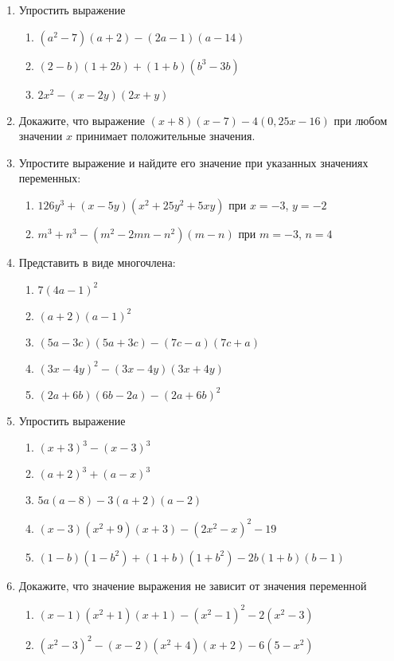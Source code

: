\documentclass[10pt, a4paper]{article}
\begin{document}

\begin{enumerate}
	\item Упростить выражение
	\begin{enumerate}[label=\asbuk*)]
		\item $(a^2-7)(a+2)-(2a-1)(a-14)$
		\item $(2-b)(1+2b)+(1+b)(b^3-3b)$
		\item $2x^2-(x-2y)(2x+y)$
	\end{enumerate}
	\item Докажите, что выражение $(x+8)(x-7)-4(0,25x-16)$ при любом значении $x$ принимает положительные значения.
	\item Упростите выражение и найдите его значение при указанных значениях переменных:
	\begin{enumerate}[label=\asbuk*)]
		\item $126y^3+(x-5y)(x^2+25y^2+5xy)$ при $x=-3$, $y=-2$
		\item $m^3+n^3-(m^2-2mn-n^2)(m-n)$ при $m=-3$, $n=4$
	\end{enumerate}
	\item Представить в виде многочлена:
	\begin{multicols}{2}
		\begin{enumerate}[label=\asbuk*)]
			\item $7(4a-1)^2$
			\item $(a+2)(a-1)^2$
			\item $(5a-3c)(5a+3c)-(7c-a)(7c+a)$
			\item $(3x-4y)^2-(3x-4y)(3x+4y)$
			\item $(2a+6b)(6b-2a)-(2a+6b)^2$
		\end{enumerate}
	\end{multicols}
	\item Упростить выражение
	\begin{multicols}{2}
		\begin{enumerate}[label=\asbuk*)]
			\item $(x+3)^3-(x-3)^3$
			\item $(a+2)^3+(a-x)^3$
			\item $5a(a-8)-3(a+2)(a-2)$
			\item $(x-3)(x^2+9)(x+3)-(2x^2-x)^2-19$
			\item $(1-b)(1-b^2)+(1+b)(1+b^2)-2b(1+b)(b-1)$
		\end{enumerate}
	\end{multicols}
	\item Докажите, что значение выражения не зависит от значения переменной
	\begin{enumerate}[label=\asbuk*)]
		\item $(x-1)(x^2+1)(x+1)-(x^2-1)^2-2(x^2-3)$
		\item $(x^2-3)^2-(x-2)(x^2+4)(x+2)-6(5-x^2)$
	\end{enumerate}
\end{enumerate}
\end{document}
